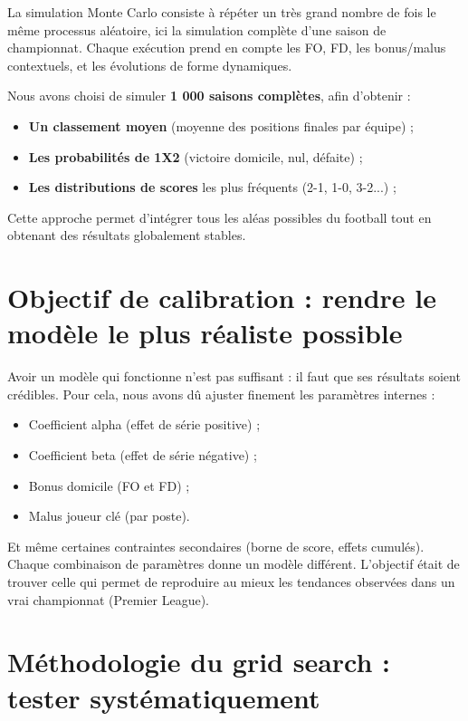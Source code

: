\documentclass[12pt]{report}
\begin{document}
La simulation Monte Carlo consiste à répéter un très grand nombre de fois le même processus aléatoire, ici la simulation complète d’une saison de championnat. Chaque exécution prend en compte les FO, FD, les bonus/malus contextuels, et les évolutions de forme dynamiques.

Nous avons choisi de simuler \textbf{1 000 saisons complètes}, afin d’obtenir :
\begin{itemize}
  \item \textbf{Un classement moyen} (moyenne des positions finales par équipe) ;
  \item \textbf{ Les probabilités de 1X2} (victoire domicile, nul, défaite) ;
  \item \textbf{Les distributions de scores} les plus fréquents (2-1, 1-0, 3-2...) ;
\end{itemize}

Cette approche permet d’intégrer tous les aléas possibles du football tout en obtenant des résultats globalement stables.

\section{Objectif de calibration : rendre le modèle le plus réaliste possible}

Avoir un modèle qui fonctionne n’est pas suffisant : il faut que ses résultats soient crédibles. Pour cela, nous avons dû ajuster finement les paramètres internes :\\
\begin{itemize}
  \item Coefficient alpha (effet de série positive) ;
  \item Coefficient beta (effet de série négative) ;
  \item Bonus domicile (FO et FD) ;
  \item Malus joueur clé (par poste).
\end{itemize}

Et même certaines contraintes secondaires (borne de score, effets cumulés).
Chaque combinaison de paramètres donne un modèle différent. L’objectif était de trouver celle qui permet de reproduire au mieux les tendances observées dans un vrai championnat (Premier League).

\section{Méthodologie du grid search : tester systématiquement}
\end{document}
